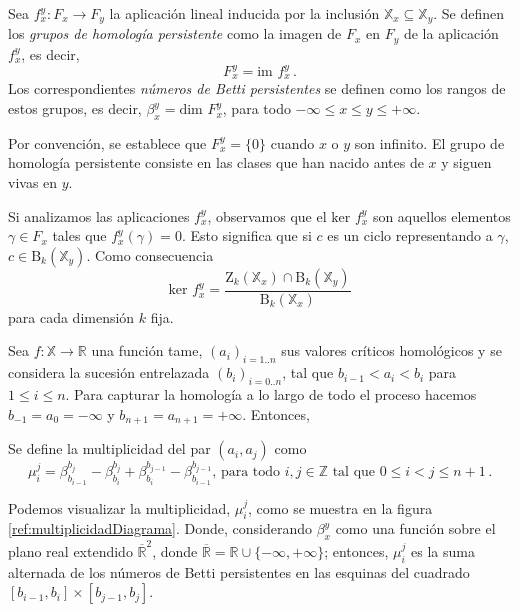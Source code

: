 \begin{definition}
Sea ${f_{x}^{y}: F_x \to F_y}$ la aplicación lineal inducida por la inclusión $\mathbb{X}_{x} \subseteq \mathbb{X}_{y}$. Se definen los \emph{grupos de homología persistente} como la imagen de $F_x$ en $F_y$ de la aplicación $f_{x}^{y}$, es decir,
\[
F_{x}^{y} = \text{im } f_{x}^{y}\,.
\]
Los correspondientes \emph{números de Betti persistentes} se definen como los rangos de estos grupos, es decir, $\beta_{x}^{y} = \text{dim } F_{x}^{y}$, para todo $-\infty \leq x \leq y \leq + \infty$. 
\end{definition}
Por convención, se establece que $F_{x}^{y}= \{0\}$ cuando $x$ o $y$ son infinito. El grupo de homología persistente consiste en las clases que han nacido antes de $x$ y siguen vivas en $y$.


\begin{remark}
Si analizamos las aplicaciones $f_{x}^{y}$, observamos que el $\text{ker } f_{x}^{y}$ son aquellos elementos $\gamma \in F_x$ tales que $f_{x}^{y}(\gamma)=0$. Esto significa que si $c$ es un ciclo representando a $\gamma$, $c \in \text{B}_k(\mathbb{X}_y)$. Como consecuencia
\[
\text{ker } f_{x}^{y} = \dfrac{\text{Z}_k(\mathbb{X}_x) \cap \text{B}_k(\mathbb{X}_y)}{\text{B}_k(\mathbb{X}_x)}
\]
para cada dimensión $k$ fija. 
\end{remark}

Sea $f: \mathbb{X} \to \mathbb{R}$ una función tame, $(a_i)_{i=1..n}$ sus valores críticos homológicos y se considera la sucesión entrelazada $(b_i)_{i=0..n}$, tal que $b_{i-1} < a_{i} < b_{i}$ para $1 \leq i \leq n$. Para capturar la homología a lo largo de todo el proceso hacemos $b_{-1} = a_0 = -\infty$ y $b_{n+1} = a_{n+1} = +\infty$. Entonces,
\begin{definition}
Se define la multiplicidad del par $(a_i, a_j)$ como
\[
\mu_{i}^{j} = \beta_{b_{i-1}}^{b_j} - \beta_{b_i}^{b_j} +  \beta_{b_i}^{b_{j-1}} - \beta_{b_{i-1}}^{b_{j-1}} \text{, para todo } i, j \in \mathbb{Z} \text{ tal que } 0 \leq i < j \leq n+1\,.
\]
\end{definition}

\begin{sloppypar}
Podemos visualizar la multiplicidad, $\mu_{i}^{j}$, como se muestra en la figura \ref{ref:multiplicidadDiagrama}. Donde, considerando $\beta_{x}^{y}$ como una función sobre el plano real extendido $\overline{\mathbb{R}}^2$, donde ${\overline{\mathbb{R}} = \mathbb{R} \cup \{-\infty, +\infty\}}$; entonces, $\mu_{i}^{j}$ es la suma alternada de los números de Betti persistentes en las esquinas del cuadrado $[b_{i-1}, b_i]\times[b_{j-1}, b_j]$.
\end{sloppypar}

